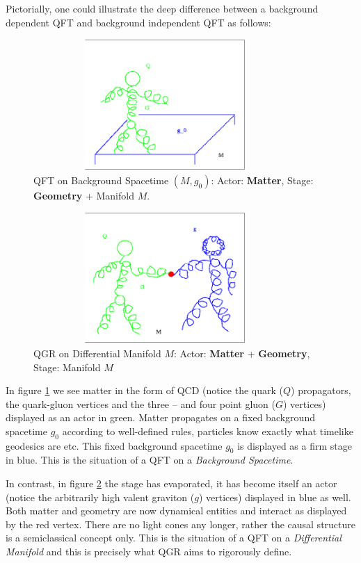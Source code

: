 \documentclass[12pt]{report}
\def\blue{\relax}
\def\green{\relax}
\begin{document}
Pictorially, one could illustrate the deep difference between a 
background dependent QFT and background independent QFT as follows:
%
\begin{figure} 
\includegraphics[width=10cm,height=5cm]{proc9fig3.ps}
\caption{QFT on Background Spacetime $(M,g_0)$:
Actor: {\bf\green Matter}, Stage: {\bf\blue Geometry} + Manifold $M$.}
\label{f3}
\end{figure}
%
\begin{figure} 
\includegraphics[width=10cm,height=5cm]{proc9fig4.ps}
\caption{QGR on Differential Manifold  $M$:
Actor: {\bf\green Matter} + {\bf\blue Geometry}, Stage: Manifold $M$}
\label{f4}
\end{figure}
%
In figure \ref{f3} we see matter in the form of QCD (notice the quark 
($Q$)
propagators, the quark-gluon vertices and the three -- and four point
gluon ($G$) vertices) displayed as an actor in green. Matter propagates on 
a fixed background spacetime $g_0$ according to well-defined rules, 
particles know exactly what timelike geodesics are etc. This fixed  
background spacetime $g_0$ is displayed as a firm stage in blue.
This is the situation of a QFT on a {\it Background Spacetime}. 

In contrast, in figure \ref{f4} the stage has evaporated, it has become
itself an actor (notice the arbitrarily high valent graviton ($g$) 
vertices) displayed in blue as well. Both matter and geometry are now
dynamical entities and interact as displayed by the red vertex. 
There are no light cones any longer, rather the causal structure 
is a semiclassical concept only. This is the situation of a QFT
on a {\it Differential Manifold} and this is precisely what QGR aims
to rigorously define. 
\end{document}
